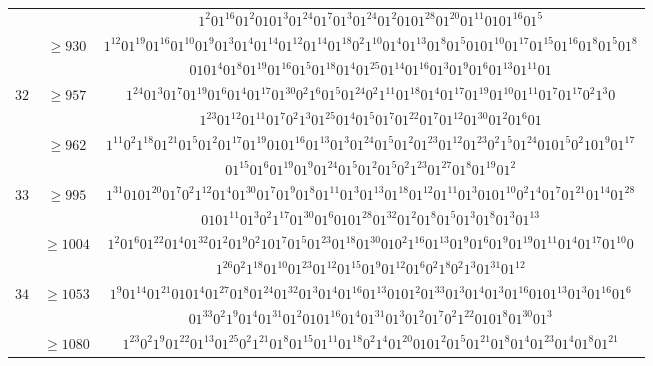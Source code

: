 \documentclass[final,3p,times]{elsarticle}
\theoremstyle{definition}
\begin{document}
\begin{appendix}
{\begin{longtable}[c]{|c|c|c|}
&& $1^{2}01^{16}01^{2}0101^{3}01^{24}01^{7}01^{3}01^{24}01^{2}0101^{28}01^{20}01^{11}0101^{16}01^{5}$\\[-1ex]
& $\geq 930$ & $1^{12}01^{19}01^{16}01^{10}01^{9}01^{3}01^{4}01^{14}01^{12}01^{14}01^{18}0^{2}1^{10}01^{4}01^{13}01^{8}01^{5}0101^{10}01^{17}01^{15}01^{16}01^{8}01^{5}01^{8}$\\[-2ex]
&& $0101^{4}01^{8}01^{19}01^{16}01^{5}01^{18}01^{4}01^{25}01^{14}01^{16}01^{3}01^{9}01^{6}01^{13}01^{11}01$\\
\hline
$32$ & $\geq 957$ & $1^{24}01^{3}01^{7}01^{19}01^{6}01^{4}01^{17}01^{30}0^{2}1^{6}01^{5}01^{24}0^{2}1^{11}01^{18}01^{4}01^{17}01^{19}01^{10}01^{11}01^{7}01^{17}0^{2}1^{3}0$\\[-2ex]
&& $1^{23}01^{12}01^{11}01^{7}0^{2}1^{3}01^{25}01^{4}01^{5}01^{7}01^{22}01^{7}01^{12}01^{30}01^{2}01^{6}01$\\[-1ex]
& $\geq 962$ & $1^{11}0^{2}1^{18}01^{21}01^{5}01^{2}01^{17}01^{19}0101^{16}01^{13}01^{3}01^{24}01^{5}01^{2}01^{23}01^{12}01^{23}0^{2}1^{5}01^{24}0101^{5}0^{2}101^{9}01^{17}$\\[-2ex]
&& $01^{15}01^{6}01^{19}01^{9}01^{24}01^{5}01^{2}01^{5}0^{2}1^{23}01^{27}01^{8}01^{19}01^{2}$\\
\hline
$33$ & $\geq 995$ & $1^{31}0101^{20}01^{7}0^{2}1^{12}01^{4}01^{30}01^{7}01^{9}01^{8}01^{11}01^{3}01^{13}01^{18}01^{12}01^{11}01^{3}0101^{10}0^{2}1^{4}01^{7}01^{21}01^{14}01^{28}$\\[-2ex]
&& $0101^{11}01^{3}0^{2}1^{17}01^{30}01^{6}0101^{28}01^{32}01^{2}01^{8}01^{5}01^{3}01^{8}01^{3}01^{13}$\\[-1ex]
& $\geq 1004$ & $1^{2}01^{6}01^{22}01^{4}01^{32}01^{2}01^{9}0^{2}101^{7}01^{5}01^{23}01^{18}01^{30}010^{2}1^{16}01^{13}01^{9}01^{6}01^{9}01^{19}01^{11}01^{4}01^{17}01^{10}0$\\[-2ex]
&& $1^{26}0^{2}1^{18}01^{10}01^{23}01^{12}01^{15}01^{9}01^{12}01^{6}0^{2}1^{8}0^{2}1^{3}01^{31}01^{12}$\\
\hline
$34$ & $\geq 1053$ & $1^{9}01^{14}01^{21}0101^{4}01^{27}01^{8}01^{24}01^{32}01^{3}01^{4}01^{16}01^{13}0101^{2}01^{33}01^{3}01^{4}01^{3}01^{16}0101^{13}01^{3}01^{16}01^{6}$\\[-2ex]
&& $01^{33}0^{2}1^{9}01^{4}01^{31}01^{2}0101^{16}01^{4}01^{31}01^{3}01^{2}01^{7}0^{2}1^{22}0101^{8}01^{30}01^{3}$\\[-1ex]
& $\geq 1080$ & $1^{23}0^{2}1^{9}01^{22}01^{13}01^{25}0^{2}1^{21}01^{8}01^{15}01^{11}01^{18}0^{2}1^{4}01^{20}0101^{2}01^{5}01^{21}01^{8}01^{4}01^{23}01^{4}01^{8}01^{21}$\\[-2ex]

\end{longtable}}
\end{appendix}
\end{document}
